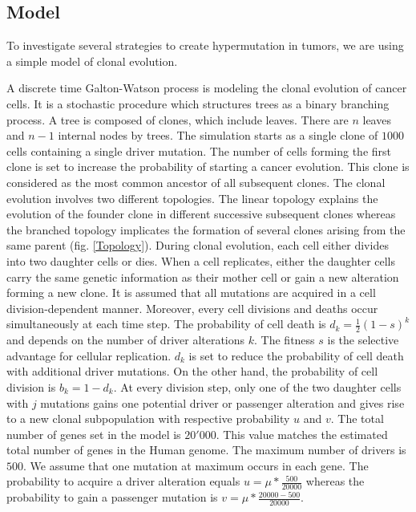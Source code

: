 \documentclass[a4paper]{article}
\begin{document}
\newpage
\begin{multicols}{2}
\section{Model}
To investigate several strategies to create hypermutation in tumors, we are using a simple model of clonal evolution.

A discrete time Galton-Watson process is modeling the clonal evolution of cancer cells. It is a stochastic procedure which structures trees as a binary branching process. A tree is composed of clones, which include leaves. There are $n$ leaves and $n-1$ internal nodes by trees\cite{MCF}. The simulation starts as a single clone of $1000$ cells containing a single driver mutation. The number of cells forming the first clone is set to increase the probability of starting a cancer evolution. This clone is considered as the most common ancestor of all subsequent clones. The clonal evolution involves two different topologies. The linear topology explains the evolution of the founder clone in different successive subsequent clones whereas the branched topology implicates the formation of several clones arising from the same parent (fig. \ref{Topology}). During clonal evolution, each cell either divides into two daughter cells or dies. When a cell replicates, either the daughter cells carry the same genetic information as their mother cell or gain a new alteration forming a new clone. It is assumed that all mutations are acquired in a cell division-dependent manner. Moreover, every cell divisions and deaths occur simultaneously at each time step. The probability of cell death is $d_k=\frac{1}{2}(1-s)^k$ and depends on the number of driver alterations $k$. The fitness $s$ is the selective advantage for cellular replication. $d_k$ is set to reduce the probability of cell death with additional driver mutations. On the other hand, the probability of cell division is $b_k=1-d_k$. At every division step, only one of the two daughter cells with $j$ mutations gains one potential driver or passenger alteration and gives rise to a new clonal subpopulation with respective probability $u$ and $v$. The total number of genes set in the model is $20'000$. This value matches the estimated total number of genes in the Human genome\cite{nbgenes}. The maximum number of drivers is $500$. We assume that one mutation at maximum occurs in each gene. The probability to acquire a driver alteration equals $u=\mu*\frac{500}{20000}$ whereas the probability to gain a passenger mutation is $v=\mu*\frac{20000-500}{20000}$.


\end{multicols}
\end{document}
